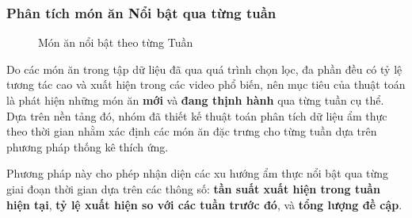 \subsubsection{Phân tích món ăn Nổi bật qua từng tuần}
\begin{figure}[H]
    \centering
    \caption{Món ăn nổi bật theo từng Tuần}
    \label{fig:mon_an_noi_bat}
\end{figure}

Do các món ăn trong tập dữ liệu đã qua quá trình chọn lọc, đa phần đều có tỷ lệ tương tác cao và xuất hiện trong các video phổ biến, nên mục tiêu của thuật toán là phát hiện những món ăn \textbf{mới} và \textbf{đang thịnh hành} qua từng tuần cụ thể. Dựa trên nền tảng đó, nhóm đã thiết kế thuật toán phân tích dữ liệu ẩm thực theo thời gian nhằm xác định các món ăn đặc trưng cho từng tuần dựa trên phương pháp thống kê thích ứng. 

Phương pháp này cho phép nhận diện các xu hướng ẩm thực nổi bật qua từng giai đoạn thời gian dựa trên các thông số: \textbf{tần suất xuất hiện trong tuần hiện tại}, \textbf{tỷ lệ xuất hiện so với các tuần trước đó}, và \textbf{tổng lượng đề cập}.

